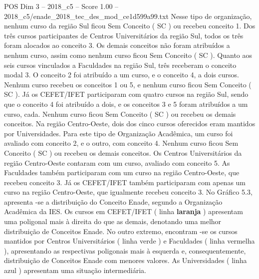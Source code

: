\begin{textsample}{POS Dim 3 – 2018\_c5 – Score 1.00 – 2018\_c5/enade\_2018\_tec\_des\_mod\_ce1d599a99.txt}
Nesse tipo de organização, nenhum curso da região Sul ficou Sem Conceito ( SC ) ou recebeu conceito 1.
Dos três cursos participantes de Centros Universitários da região Sul, todos os três foram alocados ao conceito 3.
Os demais conceitos não foram atribuídos a nenhum curso, assim como nenhum curso ficou Sem Conceito ( SC ).
Quanto aos seis cursos vinculados a Faculdades na região Sul, três receberam o conceito modal 3.
O conceito 2 foi atribuído a um curso, e o conceito 4, a dois cursos.
Nenhum curso recebeu os conceitos 1 ou 5, e nenhum curso ficou Sem Conceito ( SC ).
Já os CEFET/IFET participaram com quatro cursos na região Sul, sendo que o conceito 4 foi atribuído a dois, e os conceitos 3 e 5 foram atribuídos a um curso, cada.
Nenhum curso ficou Sem Conceito ( SC ) ou recebeu os demais conceitos.
Na região Centro-Oeste, dois dos cinco cursos oferecidos eram mantidos por Universidades.
Para este tipo de Organização Acadêmica, um curso foi avaliado com conceito 2, e o outro, com conceito 4.
Nenhum curso ficou Sem Conceito ( SC ) ou recebeu os demais conceitos.
Os Centros Universitários da região Centro-Oeste contaram com um curso, avaliado com conceito 5.
As Faculdades também participaram com um curso na região Centro-Oeste, que recebeu conceito 3.
Já os CEFET/IFET também participaram com apenas um curso na região Centro-Oeste, que igualmente recebeu conceito 3.
No Gráfico 5.3, apresenta -se a distribuição do Conceito Enade, segundo a Organização Acadêmica da IES.
Os cursos em CEFET/IFET ( linha \textbf{laranja} ) apresentam uma poligonal mais à direita do que as demais, denotando uma melhor distribuição de Conceitos Enade.
No outro extremo, encontram -se os cursos mantidos por Centros Universitários ( linha verde ) e Faculdades ( linha vermelha ), apresentando as respectivas poligonais mais à esquerda e, consequentemente, distribuição de Conceitos Enade com menores valores.
As Universidades ( linha azul ) apresentam uma situação intermediária.

\end{textsample}
